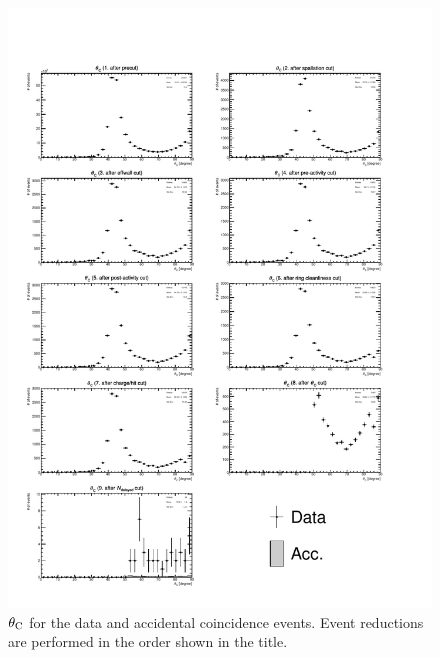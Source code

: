 \begin{figure}[h]
	\centering
	\includegraphics[width=15cm]{PDF/Dist_Data/Che_50deg_tag_ge1/angle}
	\caption[$\theta_{\rm C}$ for the data and accidental coincidence events]{
	$\theta_{\rm C}$ for the data and accidental coincidence events.
	Event reductions are performed in the order shown in the title.
	}\label{Data_angle}
\end{figure}


